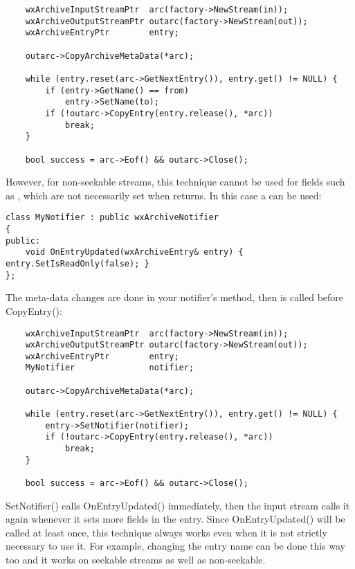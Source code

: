 \begin{verbatim}
    wxArchiveInputStreamPtr  arc(factory->NewStream(in));
    wxArchiveOutputStreamPtr outarc(factory->NewStream(out));
    wxArchiveEntryPtr        entry;

    outarc->CopyArchiveMetaData(*arc);

    while (entry.reset(arc->GetNextEntry()), entry.get() != NULL) {
        if (entry->GetName() == from)
            entry->SetName(to);
        if (!outarc->CopyEntry(entry.release(), *arc))
            break;
    }

    bool success = arc->Eof() && outarc->Close();

\end{verbatim}

However, for non-seekable streams, this technique cannot be used for
fields such as ,
which are not necessarily set when
  returns. In
this case a  can be used:

\begin{verbatim}
class MyNotifier : public wxArchiveNotifier
{
public:
    void OnEntryUpdated(wxArchiveEntry& entry) { entry.SetIsReadOnly(false); }
};

\end{verbatim}

The meta-data changes are done in your notifier's
  method,
then  is called before
CopyEntry():

\begin{verbatim}
    wxArchiveInputStreamPtr  arc(factory->NewStream(in));
    wxArchiveOutputStreamPtr outarc(factory->NewStream(out));
    wxArchiveEntryPtr        entry;
    MyNotifier               notifier;

    outarc->CopyArchiveMetaData(*arc);

    while (entry.reset(arc->GetNextEntry()), entry.get() != NULL) {
        entry->SetNotifier(notifier);
        if (!outarc->CopyEntry(entry.release(), *arc))
            break;
    }

    bool success = arc->Eof() && outarc->Close();

\end{verbatim}

SetNotifier() calls OnEntryUpdated() immediately, then the input
stream calls it again whenever it sets more fields in the entry. Since
OnEntryUpdated() will be called at least once, this technique always
works even when it is not strictly necessary to use it. For example,
changing the entry name can be done this way too and it works on seekable
streams as well as non-seekable.

